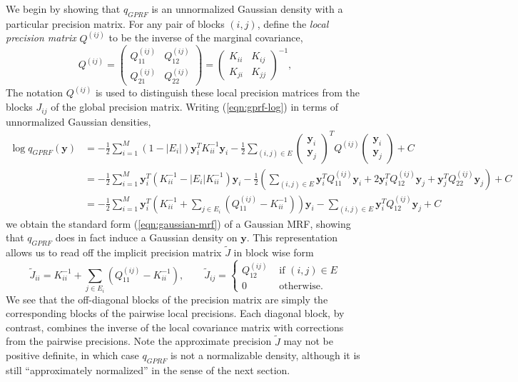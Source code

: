 \documentclass{article}
\renewcommand{\v}[1]{\mathbf{#1}}
\begin{document}
We begin by showing that $q_{GPRF}$ is an unnormalized Gaussian
density with a particular precision matrix. For any pair of blocks $(i,j)$, define the {\em local precision  matrix} $Q^{(ij)}$ to be the inverse of the marginal covariance,
\[Q^{(ij)} = \left(\begin{array}{cc} Q^{(ij)}_{11} &  Q^{(ij)}_{12}\\
  Q^{(ij)}_{21}  & Q^{(ij)}_{22}\end{array}\right) = \left(\begin{array}{cc} K_{ii} &  K_{ij}\\
  K_{ji}  & K_{jj}\end{array}\right)^{-1},\]
The notation $Q^{(ij)}$ is used to distinguish these local precision
matrices from the blocks $J_{ij}$ of the global precision matrix. Writing (\ref{eqn:gprf-log}) in terms of unnormalized Gaussian densities,
\begin{align*}
\log q_{GPRF}(\v{y}) &= -\frac{1}{2} \sum_{i=1}^M (1-|E_i|) \v{y}_i^T
K_{ii}^{-1} \v{y}_i -\frac{1}{2}  \sum_{(i,j)\in E} \left(\begin{array}{c}
      \v{y}_i \\ \v{y}_j\end{array}\right)^T Q^{(ij)}\left(\begin{array}{c}
      \v{y}_i \\
      \v{y}_j\end{array}\right) + C\\
&= -\frac{1}{2}\sum_{i=1}^M  \v{y}_i^T \left(K_{ii}^{-1} - |E_i|
  K_{ii}^{-1}\right)\v{y}_i -\frac{1}{2}  \left(\sum_{(i,j)\in E} \v{y}_i^T
Q^{(ij)}_{11} \v{y}_i + 2\v{y}_i^T Q^{(ij)}_{12}\v{y}_j + \v{y}_j^T Q^{(ij)}_{22}\v{y}_j\right) + C\\
&= -\frac{1}{2}\sum_{i=1}^M  \v{y}_i^T \left(K_{ii}^{-1} + \sum_{j\in E_i}
\left(Q^{(ij)}_{11} - K_{ii}^{-1}\right) \right)\v{y}_i - \sum_{(i,j)\in E}
\v{y}_i^T Q^{(ij)}_{12} \v{y}_j + C
\end{align*}
we obtain the standard form (\ref{eqn:gaussian-mrf}) of a Gaussian
MRF, showing that $q_{GPRF}$ does in fact induce a Gaussian density on
$\v{y}$. This
representation allows us to read off the implicit precision matrix $\tilde{J}$ in block wise form
\begin{equation}
\tilde{J}_{ii} = K_{ii}^{-1} + \sum_{j\in E_i} \left(Q^{(ij)}_{11}
    - K_{ii}^{-1}\right), \qquad \tilde{J}_{ij} =
  \left\{\begin{array}{ll}Q^{(ij)}_{12} & \text{ if } (i,j) \in E\\0
    & \text{ otherwise.}\end{array}\right.\label{eqn:approx-precision}
\end{equation}
We see that the off-diagonal blocks of the precision matrix are simply
the corresponding blocks of the pairwise local precisions. Each
diagonal block, by contrast, combines the inverse of the local
covariance matrix with corrections from the pairwise
precisions. Note the approximate precision $\tilde{J}$ may not be positive
definite, in which case $q_{GPRF}$ is not a normalizable density,
although it is still ``approximately normalized'' in the sense of the next section. 
\end{document}
